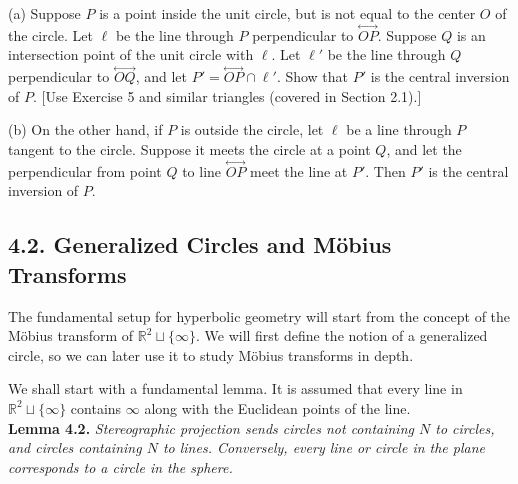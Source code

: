 \documentclass[leqno]{book}
\begin{document}
\begin{enumerate}
(a) Suppose $P$ is a point inside the unit circle, but is not equal to the center $O$ of the circle.  Let $\ell$ be the line through $P$ perpendicular to $\overset{\longleftrightarrow}{OP}$.  Suppose $Q$ is an intersection point of the unit circle with $\ell$.  Let $\ell'$ be the line through $Q$ perpendicular to $\overset{\longleftrightarrow}{OQ}$, and let $P'=\overset{\longleftrightarrow}{OP}\cap\ell'$.  Show that $P'$ is the central inversion of $P$. [Use Exercise 5 and similar triangles (covered in Section 2.1).]

(b) On the other hand, if $P$ is outside the circle, let $\ell$ be a line through $P$ tangent to the circle.  Suppose it meets the circle at a point $Q$, and let the perpendicular from point $Q$ to line $\overset{\longleftrightarrow}{OP}$ meet the line at $P'$.  Then $P'$ is the central inversion of $P$.
\end{enumerate}

\subsection*{4.2. Generalized Circles and M\"obius Transforms}
The fundamental setup for hyperbolic geometry will start from the concept of the M\"obius transform of $\mathbb R^2\sqcup\{\infty\}$.  We will first define the notion of a generalized circle, so we can later use it to study M\"obius transforms in depth.

We shall start with a fundamental lemma.  It is assumed that every line in $\mathbb R^2\sqcup\{\infty\}$ contains $\infty$ along with the Euclidean points of the line.\\

\noindent\textbf{Lemma 4.2.} \emph{Stereographic projection sends circles not containing $N$ to circles, and circles containing $N$ to lines.  Conversely, every line or circle in the plane corresponds to a circle in the sphere.}\\
\end{document}
